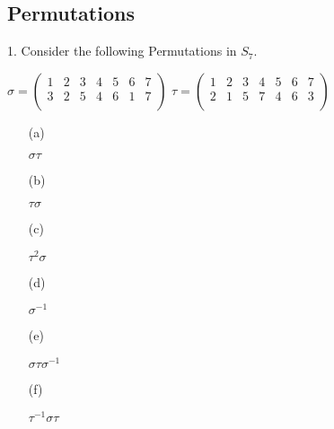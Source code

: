 \subsection{Permutations} %
\begin{mdframed}[style=darkQuesion]
  1. Consider the following Permutations in $S_7$.
  \begin{multicols}{2}
    $\sigma=
      \begin{pmatrix}
        1 & 2 & 3 & 4 & 5 & 6 & 7 \\
        3 & 2 & 5 & 4 & 6 & 1 & 7 \\
      \end{pmatrix}$
    $\tau=
      \begin{pmatrix}
        1 & 2 & 3 & 4 & 5 & 6 & 7 \\
        2 & 1 & 5 & 7 & 4 & 6 & 3 \\
      \end{pmatrix}$
  \end{multicols}
  \vspace{.25in}
  \begin{itemize}
    \item [(a)]{$\sigma\tau$

          }
    \item [(b)]{$\tau\sigma$

          }
    \item [(c)]{$\tau^2\sigma$

          }
    \item [(d)]{$\sigma^{-1}$

          }
    \item [(e)]{$\sigma\tau\sigma^{-1}$

          }
    \item [(f)]{$\tau^{-1}\sigma\tau$

          }
  \end{itemize}
\end{mdframed}

